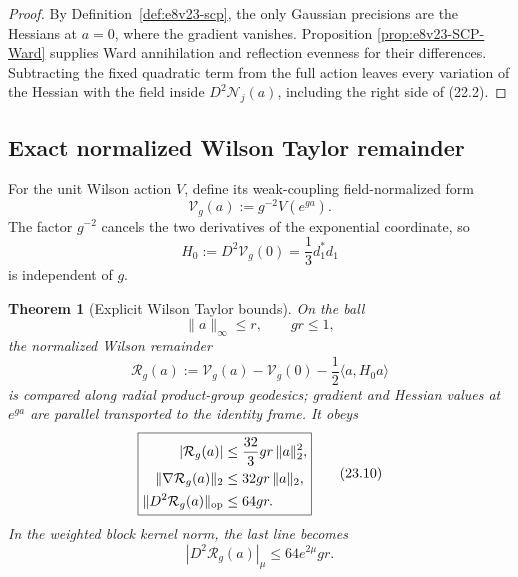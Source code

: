 \documentclass[11pt,oneside]{book}
\newtheorem{theorem}{Theorem}[chapter]
\theoremstyle{definition}
\theoremstyle{remark}
\begin{document}
\begin{proof}
By Definition~\ref{def:e8v23-scp}, the only Gaussian precisions are
the Hessians at \(a=0\), where the gradient vanishes.  Proposition
\ref{prop:e8v23-SCP-Ward} supplies Ward annihilation and reflection
evenness for their differences.  Subtracting the fixed quadratic
term from the full action leaves every variation of the Hessian with
the field inside \(D^2\mathcal N_j(a)\), including the right side of
(22.2).
\end{proof}

\subsection{Exact normalized Wilson Taylor remainder}

For the unit Wilson action \(V\), define its weak-coupling
field-normalized form
\[
                         \mathcal V_g(a):=g^{-2}V(e^{ga}).          \tag{23.6}
\]
The factor \(g^{-2}\) cancels the two derivatives of the exponential
coordinate, so
\[
 H_0:=D^2\mathcal V_g(0)=\frac13d_1^*d_1                         \tag{23.7}
\]
is independent of \(g\).

\begin{theorem}[Explicit Wilson Taylor bounds]
\label{thm:e8v23-Wilson-Taylor}
On the ball
\[
               \|a\|_\infty\leq r,\qquad gr\leq1,                  \tag{23.8}
\]
the normalized Wilson remainder
\[
\mathcal R_g(a):=\mathcal V_g(a)-\mathcal V_g(0)
                  -\frac12\langle a,H_0a\rangle                   \tag{23.9}
\]
is compared along radial product-group geodesics; gradient and Hessian
values at \(e^{ga}\) are parallel transported to the identity frame.
It
obeys
\[
\boxed{
\begin{aligned}
|\mathcal R_g(a)|
 &\leq\frac{32}{3}gr\,\|a\|_2^2,\\
\|\nabla\mathcal R_g(a)\|_2
 &\leq32gr\,\|a\|_2,\\
\|D^2\mathcal R_g(a)\|_{\rm op}
 &\leq64gr.
\end{aligned}}                                                     \tag{23.10}
\]
In the weighted block kernel norm, the last line becomes
\[
                         |D^2\mathcal R_g(a)|_\mu
 \leq64e^{2\mu}gr.                                \tag{23.11}
\]
\end{theorem}
\end{document}
